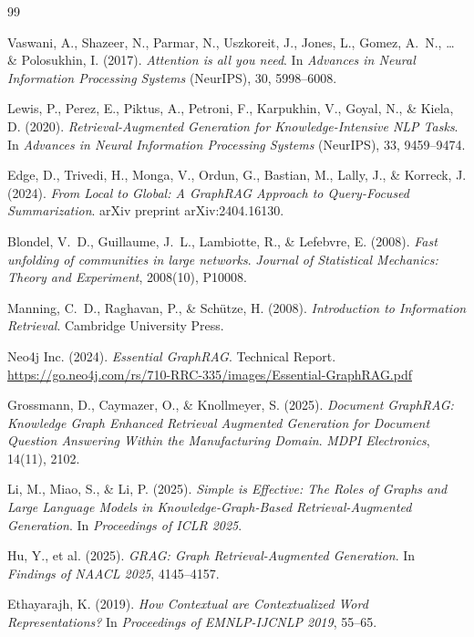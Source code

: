 \documentclass[12pt,a4paper]{report}
\theoremstyle{plain}
\theoremstyle{definition}
\begin{document}
	\begin{thebibliography}{99}
		
		Vaswani, A., Shazeer, N., Parmar, N., Uszkoreit, J., Jones, L., Gomez, A.~N.,
		\ldots{} \& Polosukhin, I. (2017).
		\textit{Attention is all you need}.
		In \textit{Advances in Neural Information Processing Systems} (NeurIPS), 30,
		5998--6008.
		
		Lewis, P., Perez, E., Piktus, A., Petroni, F., Karpukhin, V., Goyal, N.,
		\& Kiela, D. (2020).
		\textit{Retrieval-Augmented Generation for Knowledge-Intensive NLP Tasks}.
		In \textit{Advances in Neural Information Processing Systems} (NeurIPS), 33,
		9459--9474.
		
		Edge, D., Trivedi, H., Monga, V., Ordun, G., Bastian, M., Lally, J.,
		\& Korreck, J. (2024).
		\textit{From Local to Global: A GraphRAG Approach to Query-Focused Summarization}.
		arXiv preprint arXiv:2404.16130.
		
		Blondel, V.~D., Guillaume, J.~L., Lambiotte, R., \& Lefebvre, E. (2008).
		\textit{Fast unfolding of communities in large networks}.
		\textit{Journal of Statistical Mechanics: Theory and Experiment}, 2008(10), P10008.
		
		Manning, C.~D., Raghavan, P., \& Schütze, H. (2008).
		\textit{Introduction to Information Retrieval}.
		Cambridge University Press.
		
		Neo4j Inc. (2024).
		\textit{Essential GraphRAG}. Technical Report.
		\url{https://go.neo4j.com/rs/710-RRC-335/images/Essential-GraphRAG.pdf}
		
		Grossmann, D., Caymazer, O., \& Knollmeyer, S. (2025).
		\textit{Document GraphRAG: Knowledge Graph Enhanced Retrieval Augmented Generation
			for Document Question Answering Within the Manufacturing Domain}.
		\textit{MDPI Electronics}, 14(11), 2102.
		
		Li, M., Miao, S., \& Li, P. (2025).
		\textit{Simple is Effective: The Roles of Graphs and Large Language Models in
			Knowledge-Graph-Based Retrieval-Augmented Generation}.
		In \textit{Proceedings of ICLR 2025}.
		
		Hu, Y., et al. (2025).
		\textit{GRAG: Graph Retrieval-Augmented Generation}.
		In \textit{Findings of NAACL 2025}, 4145--4157.
		
		Ethayarajh, K. (2019).
		\textit{How Contextual are Contextualized Word Representations?}
		In \textit{Proceedings of EMNLP-IJCNLP 2019}, 55--65.
		

\end{thebibliography}
\end{document}
